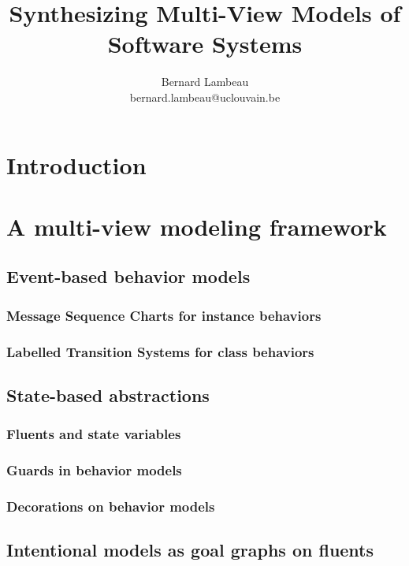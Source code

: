 \documentclass[dvips,a4paper,11pt]{report}
\begin{document}

\title{
  Synthesizing Multi-View Models of Software Systems
}
\author{Bernard Lambeau \\ bernard.lambeau@uclouvain.be}
\maketitle




\tableofcontents
\listoffigures
\listoftables


\chapter{Introduction}
\chapter{A multi-view modeling framework}
  \section{Event-based behavior models}
    \subsection{Message Sequence Charts for instance behaviors}
    \subsection{Labelled Transition Systems for class behaviors}
  \section{State-based abstractions}
    \subsection{Fluents and state variables}
    \subsection{Guards in behavior models}
    \subsection{Decorations on behavior models}
  \section{Intentional models as goal graphs on fluents}
\end{document}
